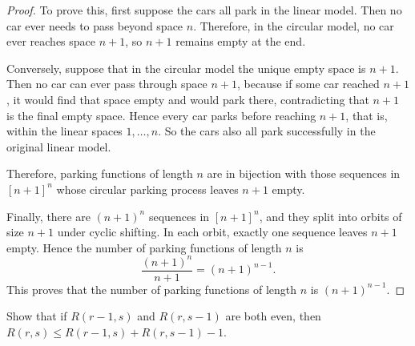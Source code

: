 \documentclass[11pt, a4paper]{ctexrep}
\begin{document}
\begin{proof}
    To prove this, first suppose the cars all park in the linear model. Then no car ever needs to pass beyond space $n$. Therefore, in the circular model, no car ever reaches space $n+1$, so $n+1$ remains empty at the end.

    Conversely, suppose that in the circular model the unique empty space is $n+1$. Then no car can ever pass through space $n+1$, because if some car reached $n+1$, it would find that space empty and would park there, contradicting that $n+1$ is the final empty space. Hence every car parks before reaching $n+1$, that is, within the linear spaces $1,\dots,n$. So the cars also all park successfully in the original linear model.

    Therefore, parking functions of length $n$ are in bijection with those sequences in $[n+1]^n$ whose circular parking process leaves $n+1$ empty.

    Finally, there are $(n+1)^n$ sequences in $[n+1]^n$, and they split into orbits of size $n+1$ under cyclic shifting. In each orbit, exactly one sequence leaves $n+1$ empty. Hence the number of parking functions of length $n$ is
    \[
        \frac{(n+1)^n}{n+1}=(n+1)^{n-1}.
    \]
    This proves that the number of parking functions of length $n$ is $(n+1)^{n-1}$.
\end{proof}

\begin{exercise}
    Show that if $R(r-1, s)$ and $R(r, s-1)$ are both even, then $R(r, s) \leq R(r-1, s) + R(r, s-1) - 1$.
\end{exercise}
\end{document}
